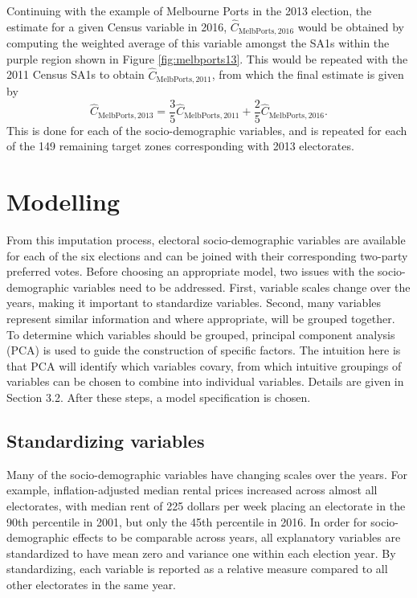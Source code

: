 \documentclass[times, doublespace]{anzsauth}
\begin{document}
Continuing with the example of Melbourne Ports in the 2013 election, the estimate for a given Census variable in 2016, \(\hat{C}_{\text{MelbPorts}, 2016}\) would be obtained by computing the weighted average of this variable amongst the SA1s within the purple region shown in Figure \ref{fig:melbports13}. This would be repeated with the 2011 Census SA1s to obtain \(\hat{C}_{\text{MelbPorts}, 2011}\), from which the final estimate is given by
\[
  \hat{C}_{\text{MelbPorts},2013}
    = \frac{3}{5} \hat{C}_{\text{MelbPorts},2011} + \frac{2}{5} \hat{C}_{\text{MelbPorts},2016}.
\]
This is done for each of the socio-demographic variables, and is repeated for each of the 149 remaining target zones corresponding with 2013 electorates.

\hypertarget{modelling}{%
\section{Modelling}\label{modelling}}

From this imputation process, electoral socio-demographic variables are available for each of the six elections and can be joined with their corresponding two-party preferred votes. Before choosing an appropriate model, two issues with the socio-demographic variables need to be addressed. First, variable scales change over the years, making it important to standardize variables. Second, many variables represent similar information and where appropriate, will be grouped together. To determine which variables should be grouped, principal component analysis (PCA) is used to guide the construction of specific factors. The intuition here is that PCA will identify which variables covary, from which intuitive groupings of variables can be chosen to combine into individual variables. Details are given in Section 3.2. After these steps, a model specification is chosen.

\hypertarget{standardizing-variables}{%
\subsection{Standardizing variables}\label{standardizing-variables}}

Many of the socio-demographic variables have changing scales over the years. For example, inflation-adjusted median rental prices increased across almost all electorates, with median rent of 225 dollars per week placing an electorate in the 90th percentile in 2001, but only the 45th percentile in 2016. In order for socio-demographic effects to be comparable across years, all explanatory variables are standardized to have mean zero and variance one within each election year. By standardizing, each variable is reported as a relative measure compared to all other electorates in the same year.
\end{document}
